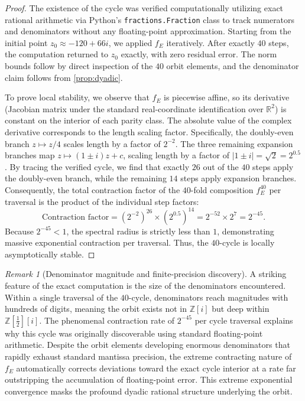 \documentclass[12pt]{article}
\theoremstyle{plain}
\theoremstyle{definition}
\theoremstyle{remark}
\newtheorem{remark}[theorem]{Remark}
\theoremstyle{definition}
\newcommand{\Z}{\mathbb{Z}}
\newcommand{\R}{\mathbb{R}}
\newcommand{\Zi}{\mathbb{Z}[i]}
\newcommand{\norm}[1]{\left|#1\right|}
\begin{document}
\begin{proof}
The existence of the cycle was verified computationally utilizing exact rational arithmetic
via Python's \texttt{fractions.Fraction} class to track numerators and denominators
without any floating-point approximation.
Starting from the initial point $z_0 \approx -120 + 66i$,
we applied $f_E$ iteratively.
After exactly $40$ steps, the computation returned to $z_0$
exactly, with zero residual error.
The norm bounds follow by direct inspection of the $40$ orbit elements,
and the denominator claim follows from \cref{prop:dyadic}.

To prove local stability, we observe that $f_E$ is piecewise affine, so its derivative
(Jacobian matrix under the standard real-coordinate identification over $\R^2$)
is constant on the interior of each parity class. The absolute value of the complex derivative corresponds to the length scaling factor.
Specifically, the doubly-even branch $z \mapsto z/4$ scales length by a factor of $2^{-2}$.
The three remaining expansion branches map $z \mapsto (1\pm i)z + c$, scaling length by a factor of $\norm{1\pm i} = \sqrt{2} = 2^{0.5}$.
By tracing the verified cycle, we find that exactly $26$ out of the $40$ steps apply the
doubly-even branch, while the remaining $14$ steps apply expansion branches. Consequently,
the total contraction factor of the $40$-fold composition $f_E^{40}$ per traversal is
the product of the individual step factors:
\[
    \text{Contraction factor} = (2^{-2})^{26} \times (2^{0.5})^{14} = 2^{-52} \times 2^7 = 2^{-45}.
\]
Because $2^{-45} < 1$, the spectral radius is strictly less than $1$, demonstrating
massive exponential contraction per traversal. Thus, the $40$-cycle is locally asymptotically stable.
\end{proof}

\begin{remark}[Denominator magnitude and finite-precision discovery]
A striking feature of the exact computation is the size of
the denominators encountered. Within a single traversal of
the $40$-cycle, denominators reach
magnitudes with hundreds of digits, meaning the orbit exists not in $\Zi$ but deep within
$\Z[\tfrac{1}{2}][i]$.
The phenomenal contraction rate of $2^{-45}$ per cycle traversal explains why this cycle was originally discoverable using standard floating-point arithmetic. Despite the orbit elements developing enormous denominators that rapidly exhaust standard mantissa precision, the extreme contracting nature of $f_E$ automatically corrects deviations toward the exact cycle interior at a rate far outstripping the accumulation of floating-point error. This extreme exponential convergence masks the profound dyadic rational structure underlying the orbit.
\end{remark}
\end{document}
